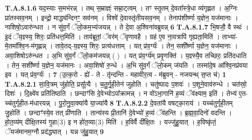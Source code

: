 \documentclass[17pt]{extarticle}
\begin{document}
                  \newline
                                                                  \textbf{ T.A.8.1.6} \newline
                  यद॒स्याः स॒मभ॑रन्न् । तथ् स॒म्राज्ञ्ः॑ सम्रा॒ट्त्वम् ।  तꣳ स्तृ॒तम् दे॒वता᳚स्त्रे॒धा व्य॑गृह्णत । अ॒ग्निः प्रा॑तस्सव॒नम् । इन्द्रो॒ माद्ध्य॑न्दिनꣳ॒॒ सव॑नम् । विश्वे॑ दे॒वास्तृ॑तीयसव॒नम् । तेनाप॑शीर्ष्णा य॒ज्ञेन॒ यज॑मानाः । नाशिषो॒ऽवारु॑न्धत ।  न सु॑व॒र्गं ॅलो॒कम॒भ्य॑जयन्न् ।  ते दे॒वा अ॒श्विना॑वब्रुवन्न् \textbf{ 6} \newline
                  \newline
                                                                  \textbf{ T.A.8.1.7} \newline
                  भि॒षजौ॒ वै स्थः॑ । इ॒दं ॅय॒ज्ञ्स्य॒ शिरः॒ प्रति॑धत्त॒मिति॑ । ताव॑ब्रूतां॒ ॅवर॑म् ॅवृणावहै । ग्रह॑ ए॒व ना॒वत्रापि॑ गृह्यता॒मिति॑ ।  ताभ्या॑-मे॒तमा᳚श्वि॒न-म॑गृह्णन्न् ।  तावे॒तद्-य॒ज्ञ्स्य॒ शिरः॒ प्रत्य॑धत्ताम् ।  यत् प्र॑व॒र्ग्यः॑ । तेन॒ सशी᳚र्ष्णा य॒ज्ञेन॒ यज॑मानाः । अवा॒शिषोऽरु॑न्धत ।  अ॒भि सु॑व॒र्गं ॅलो॒कम॑जयन्न् ( ) । यत् प्र॑व॒र्ग्य॑म् प्रवृ॒णक्ति॑ । य॒ज्ञ्स्यै॒व तच्छिरः॒ प्रति॑दधाति ।  तेन॒ सशी᳚र्ष्णा य॒ज्ञेन॒ यज॑मानः ।  अवा॒शिषो॑ रु॒न्धे । अ॒भि सु॑व॒र्गं ॅलो॒कम् ज॑यति ।  तस्मा॑दे॒ष आ᳚श्वि॒नप्र॑वया इव । यत् प्र॑व॒र्ग्यः॑ । \textbf{ 7} \newline
                  \newline
                                                        (उ॒त्क॒रो - ह्ये॑ - ते - तृ॑न्दन्ति - महावीर॒त्व - म॑ब्रुवन् - नजयन्थ् स॒प्त च॑) \textbf{1} \newline \newline
                                \textbf{ T.A.8.2.1} \newline
                  सा॒वि॒त्रम् जु॑होति॒ प्रसू᳚त्यै । च॒तु॒र्गृ॒ही॒तेन॑ जुहोति ।  चतु॑ष्पादः प॒शवः॑ । प॒शूने॒वाव॑रुन्धे । चत॑स्रो॒ दिशः॑ । दि॒क्ष्वे॑व प्रति॑तिष्ठति ।  छन्दाꣳ॑सि दे॒वेभ्योऽपा᳚क्रामन्न् ।  न वो॑ऽभा॒गानि॑ ह॒व्यं ॅव॑क्ष्याम॒ इति॑ ।  तेभ्य॑ ए॒त-च्च॑तुर्गृही॒त-म॑धारयन्न् । पु॒रो॒नु॒वा॒क्या॑यै या॒ज्या॑यै \textbf{ 8} \newline
                  \newline
                                                                  \textbf{ T.A.8.2.2} \newline
                  दे॒वता॑यै वषट्का॒राय॑ । यच्च॑तुर्गृही॒तम् जु॒होति॑ ।  छन्दाꣳ॑स्ये॒व तत् प्री॑णाति । तान्य॑स्य प्री॒तानि॑ दे॒वेभ्यो॑ ह॒व्यं ॅव॑हन्ति । ब्र॒ह्म॒वा॒दिनो॑ वदन्ति । हो॒त॒व्य॑म् दीक्षि॒तस्य॑ गृ॒हा(3) इ न हो॑त॒व्या(3) मिति॑ । ह॒विर्वै दी᳚क्षि॒तः । यज्जु॑हु॒यात् । ह॒विष्कृ॑तं॒ ॅयज॑मानम॒ग्नौ प्रद॑द्ध्यात् ।  यन्न जु॑हु॒यात् \textbf{ 9} \newline
\end{document}
